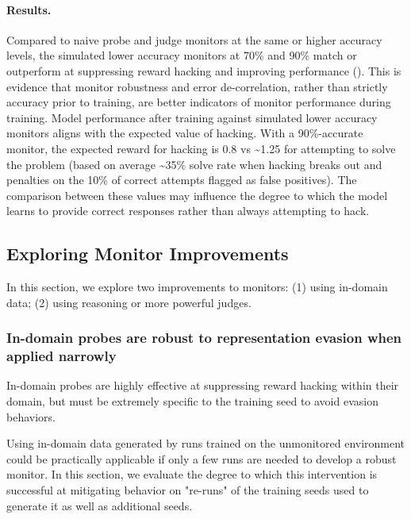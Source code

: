\documentclass{article}
\begin{document}
\paragraph{Results.} Compared to naive probe and judge monitors at the same or higher accuracy levels, the simulated lower accuracy monitors at 70\% and 90\% match or outperform at suppressing reward hacking and improving performance (). This is evidence that monitor robustness and error de-correlation, rather than strictly accuracy prior to training, are better indicators of monitor performance during training. Model performance after training against simulated lower accuracy monitors aligns with the expected value of hacking. With a 90\%-accurate monitor, the expected reward for hacking is 0.8 vs \textasciitilde1.25 for attempting to solve the problem (based on average \textasciitilde35\% solve rate when hacking breaks out and penalties on the 10\% of correct attempts flagged as false positives). The comparison between these values may influence the degree to which the model learns to provide correct responses rather than always attempting to hack.





\subsection{Exploring Monitor Improvements}
\label{sec:monitorimprovements}


In this section, we explore two improvements to monitors: (1) using in-domain data; (2) using reasoning or more powerful judges. 

\subsubsection{In-domain probes are robust to representation evasion when applied narrowly}
\label{sec:indomain_probes}

\begin{takeawaybox}
    In-domain probes are highly effective at suppressing reward hacking within their domain, but must be extremely specific to the training seed to avoid evasion behaviors.
\end{takeawaybox}

Using in-domain data generated by runs trained on the unmonitored environment could be practically applicable if only a few runs are needed to develop a robust monitor. In this section, we evaluate the degree to which this intervention is successful at mitigating behavior on "re-runs" of the training seeds used to generate it as well as additional seeds.
\end{document}
